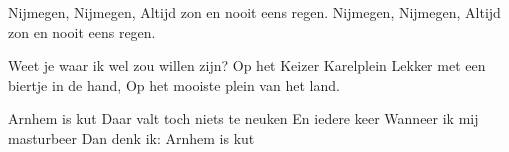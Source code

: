 \begin{verse*}
Nijmegen, Nijmegen,
Altijd zon en nooit eens regen.
Nijmegen, Nijmegen,
Altijd zon en nooit eens regen.
\end{verse*}

\begin{verse*}
Weet je waar ik wel zou willen zijn?
Op het Keizer Karelplein 
Lekker met een biertje in de hand,
Op het mooiste plein van het land.
\end{verse*}

\begin{verse*}
Arnhem is kut
Daar valt toch niets te neuken
En iedere keer
Wanneer ik mij masturbeer
Dan denk ik: Arnhem is kut
\end{verse*}
